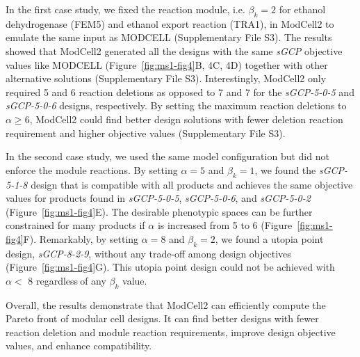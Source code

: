 In the first case study, we fixed the reaction module, i.e.
\(\beta_{k} = 2\) for ethanol dehydrogenase (FEM5) and ethanol export reaction (TRA1), in ModCell2 to emulate the same input as MODCELL (Supplementary File S3).
The results showed that ModCell2 generated all the designs with the same \emph{sGCP} objective values like MODCELL (Figure~\ref{fig:ms1-fig4}B, 4C, 4D) together with other alternative solutions (Supplementary File S3).
Interestingly, ModCell2 only required 5 and 6 reaction deletions as opposed to 7 and 7 for the \emph{sGCP-5-0-5} and \emph{sGCP-5-0-6} designs, respectively.
By setting the maximum reaction deletions to \(\alpha \geq 6\), ModCell2 could find better design solutions with fewer deletion reaction requirement and higher objective values (Supplementary File S3).

In the second case study, we used the same model configuration but did not enforce the module reactions.
By setting \(\alpha = 5\) and \(\beta_{k} = 1\), we found the \emph{sGCP-5-1-8} design that is compatible with all products and achieves the same objective values for products found in \emph{sGCP-5-0-5}, \emph{sGCP-5-0-6}, and \emph{sGCP-5-0-2} (Figure~\ref{fig:ms1-fig4}E).
The desirable phenotypic spaces can be further constrained for many products if \(\alpha\) is increased from 5 to 6 (Figure~\ref{fig:ms1-fig4}F).
Remarkably, by setting \(\alpha = 8\) and \(\beta_{k} = 2\), we found a utopia point design, \emph{sGCP-8-2-9}, without any trade-off among design objectives (Figure~\ref{fig:ms1-fig4}G).
This utopia point design could not be achieved with \(\alpha <\) 8 regardless\(\ \)of any \(\beta_{k}\) value.

Overall, the results demonstrate that ModCell2 can efficiently compute the Pareto front of modular cell designs.
It can find better designs with fewer reaction deletion and module reaction requirements, improve design objective values, and enhance compatibility.

